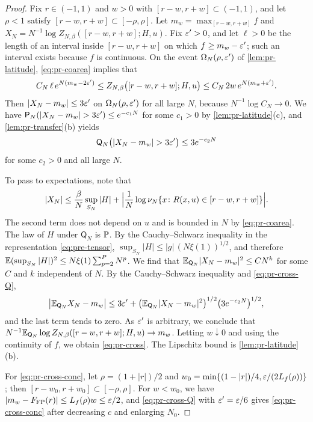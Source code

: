 \begin{proof}
Fix $r\in(-1,1)$ and $w>0$ with $[r-w,r+w]\subset(-1,1)$, and let $\rho<1$ satisfy $[r-w,r+w]\subset[-\rho,\rho]$. Let $m_w=\max_{[r-w,r+w]}f$ and $X_N=N^{-1}\log Z_{N,\beta}([r-w,r+w];H,u)$. Fix $\varepsilon'>0$, and let $\ell>0$ be the length of an interval inside $[r-w,r+w]$ on which $f\ge m_w-\varepsilon'$; such an interval exists because $f$ is continuous. On the event $\Omega_N(\rho,\varepsilon')$ of \cref{lem:pr-latitude}, \eqref{eq:pr-coarea} implies that
\[
C_N\,\ell\,e^{N(m_w-2\varepsilon')}\le Z_{N,\beta}\bigl([r-w,r+w];H,u\bigr)\le C_N\,2w\,e^{N(m_w+\varepsilon')} .
\]
Then $|X_N-m_w|\le3\varepsilon'$ on $\Omega_N(\rho,\varepsilon')$ for all large $N$, because $N^{-1}\log C_N\to0$. We have $\mathsf P_N(|X_N-m_w|>3\eps')\le e^{-c_1N}$ for some $c_1>0$ by \cref{lem:pr-latitude}(c), and \cref{lem:pr-transfer}(b) yields
\begin{equation}\label{eq:pr-cross-Q}
\mathsf Q_N\bigl(|X_N-m_w|>3\eps'\bigr)\le 3e^{-c_2N}
\end{equation}
for some $c_2>0$ and all large $N$.

To pass to expectations, note that
\[
|X_N|\le\frac\beta N\sup_{S_N}|H|+\Bigl|\frac1N\log\nu_N\{x\colon R(x,u)\in[r-w,r+w]\}\Bigr| .
\]
The second term does not depend on $u$ and is bounded in $N$ by \eqref{eq:pr-coarea}. The law of $H$ under $\mathsf Q_N$ is $\mathbb P$. By the Cauchy--Schwarz inequality in the representation \eqref{eq:pre-tensor}, $\sup_{S_N}|H|\le|g|\,(N\xi(1))^{1/2}$, and therefore $\mathbb E(\sup_{S_N}|H|)^2\le N\xi(1)\sum_{p=2}^PN^p$. We find that $\mathbb E_{\mathsf Q_N}|X_N-m_w|^2\le C N^{k}$ for some $C$ and $k$ independent of $N$. By the Cauchy--Schwarz inequality and \eqref{eq:pr-cross-Q},
\[
\bigl|\mathbb E_{\mathsf Q_N}X_N-m_w\bigr|\le3\varepsilon'+\bigl(\mathbb E_{\mathsf Q_N}|X_N-m_w|^2\bigr)^{1/2}\bigl(3e^{-c_2N}\bigr)^{1/2},
\]
and the last term tends to zero. As $\varepsilon'$ is arbitrary, we conclude that $N^{-1}\mathbb E_{\mathsf Q_N}\log Z_{N,\beta}([r-w,r+w];H,u)\to m_w$. Letting $w\downarrow0$ and using the continuity of $f$, we obtain \eqref{eq:pr-cross}. The Lipschitz bound is \cref{lem:pr-latitude}(b).

For \eqref{eq:pr-cross-conc}, let $\rho=(1+|r|)/2$ and $w_0=\min\{(1-|r|)/4,\varepsilon/(2L_f(\rho))\}$; then $[r-w_0,r+w_0]\subset[-\rho,\rho]$. For $w<w_0$, we have $|m_w-F_{\mathrm{FP}}(r)|\le L_f(\rho)w\le\varepsilon/2$, and \eqref{eq:pr-cross-Q} with $\varepsilon'=\varepsilon/6$ gives \eqref{eq:pr-cross-conc} after decreasing $c$ and enlarging $N_0$.
\end{proof}


